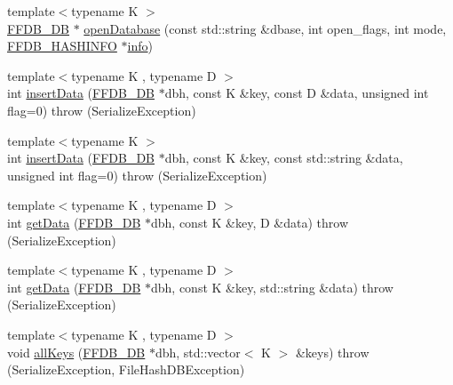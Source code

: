 \begin{DoxyCompactItemize}
{\footnotesize template$<$typename K $>$ }\\\mbox{\hyperlink{adat-devel_2other__libs_2filedb_2filehash_2ffdb__db_8h_a0b27b956926453a7a8141ea8e10f0df8}{F\+F\+D\+B\+\_\+\+DB}} $\ast$ \mbox{\hyperlink{namespaceFILEDB_a9ed602db52c9c9d3bbf1324426376c72}{open\+Database}} (const std\+::string \&dbase, int open\+\_\+flags, int mode, \mbox{\hyperlink{structFFDB__HASHINFO}{F\+F\+D\+B\+\_\+\+H\+A\+S\+H\+I\+N\+FO}} $\ast$\mbox{\hyperlink{structinfo}{info}})
\item 
{\footnotesize template$<$typename K , typename D $>$ }\\int \mbox{\hyperlink{namespaceFILEDB_a63f788f0f11a571f254ac8cfa8d19132}{insert\+Data}} (\mbox{\hyperlink{adat-devel_2other__libs_2filedb_2filehash_2ffdb__db_8h_a0b27b956926453a7a8141ea8e10f0df8}{F\+F\+D\+B\+\_\+\+DB}} $\ast$dbh, const K \&key, const D \&data, unsigned int flag=0)  throw (\+Serialize\+Exception)
\item 
{\footnotesize template$<$typename K $>$ }\\int \mbox{\hyperlink{namespaceFILEDB_aeadc0ee930c4a7b2ddae220799008bd6}{insert\+Data}} (\mbox{\hyperlink{adat-devel_2other__libs_2filedb_2filehash_2ffdb__db_8h_a0b27b956926453a7a8141ea8e10f0df8}{F\+F\+D\+B\+\_\+\+DB}} $\ast$dbh, const K \&key, const std\+::string \&data, unsigned int flag=0)  throw (\+Serialize\+Exception)
\item 
{\footnotesize template$<$typename K , typename D $>$ }\\int \mbox{\hyperlink{namespaceFILEDB_a0d18d10ad6d490786b6fe538fbd45dc3}{get\+Data}} (\mbox{\hyperlink{adat-devel_2other__libs_2filedb_2filehash_2ffdb__db_8h_a0b27b956926453a7a8141ea8e10f0df8}{F\+F\+D\+B\+\_\+\+DB}} $\ast$dbh, const K \&key, D \&data)  throw (\+Serialize\+Exception)
\item 
{\footnotesize template$<$typename K , typename D $>$ }\\int \mbox{\hyperlink{namespaceFILEDB_a7381d9e3dd76dc6eb741797e16c3052c}{get\+Data}} (\mbox{\hyperlink{adat-devel_2other__libs_2filedb_2filehash_2ffdb__db_8h_a0b27b956926453a7a8141ea8e10f0df8}{F\+F\+D\+B\+\_\+\+DB}} $\ast$dbh, const K \&key, std\+::string \&data)  throw (\+Serialize\+Exception)
\item 
{\footnotesize template$<$typename K , typename D $>$ }\\void \mbox{\hyperlink{namespaceFILEDB_a3d87ecce7111516944b8b8e532aad4ea}{all\+Keys}} (\mbox{\hyperlink{adat-devel_2other__libs_2filedb_2filehash_2ffdb__db_8h_a0b27b956926453a7a8141ea8e10f0df8}{F\+F\+D\+B\+\_\+\+DB}} $\ast$dbh, std\+::vector$<$ K $>$ \&keys)  throw (\+Serialize\+Exception, File\+Hash\+D\+B\+Exception)

\end{DoxyCompactItemize}
